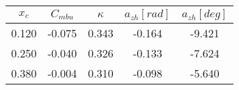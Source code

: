 \begin{tabular}{ccccc}
\toprule
 $x_c$ &  $C_{mbu}$ &  $\kappa$ &  $a_{zh} [rad]$ &  $a_{zh} [deg]$ \\
\midrule
 0.120 &     -0.075 &     0.343 &          -0.164 &          -9.421 \\
 0.250 &     -0.040 &     0.326 &          -0.133 &          -7.624 \\
 0.380 &     -0.004 &     0.310 &          -0.098 &          -5.640 \\
\bottomrule
\end{tabular}
